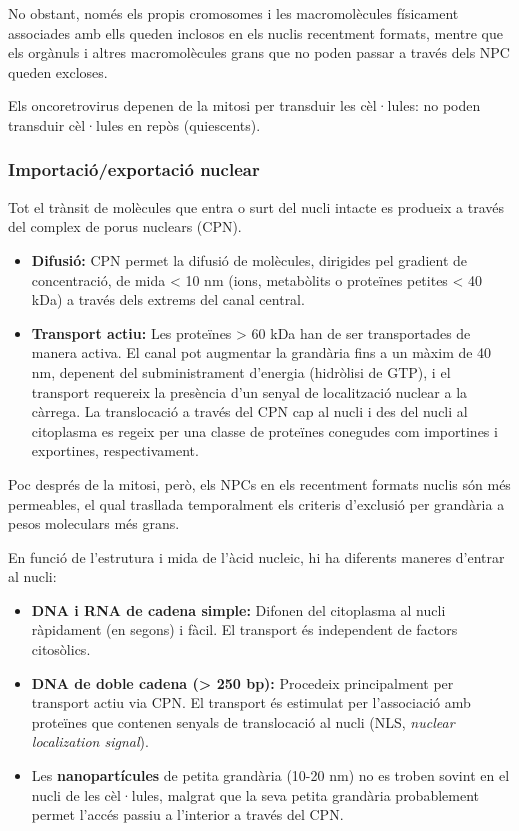 No obstant, només els propis cromosomes i les macromolècules físicament associades amb ells queden inclosos en els nuclis recentment formats, mentre que els orgànuls i altres macromolècules grans que no poden passar a través dels NPC queden excloses.

Els oncoretrovirus depenen de la mitosi per transduir les cèl·lules: no poden transduir cèl·lules en repòs (quiescents).

\subsubsection{Importació/exportació nuclear}
\label{sec:import-nucl}

Tot el trànsit de molècules que entra o surt del nucli intacte es produeix a través del complex de porus nuclears (CPN).
\begin{itemize}
\item \textbf{Difusió:} CPN permet la difusió de molècules, dirigides pel gradient de concentració, de mida < 10 nm (ions, metabòlits o proteïnes petites < 40 kDa) a través dels extrems del canal central.
\item \textbf{Transport actiu:} Les proteïnes > 60 kDa han de ser transportades de manera activa. El canal pot augmentar la grandària fins a un màxim de 40 nm, depenent del subministrament d'energia (hidròlisi de GTP), i el transport requereix la presència d'un senyal de localització nuclear a la càrrega. La translocació a través del CPN cap al nucli i des del nucli al citoplasma es regeix per una classe de proteïnes conegudes com importines i exportines, respectivament.
\end{itemize}

Poc després de la mitosi, però, els NPCs en els recentment formats nuclis són més permeables, el qual trasllada temporalment els criteris d'exclusió per grandària a pesos moleculars més grans.

En funció de l'estrutura i mida de l'àcid nucleic, hi ha diferents maneres d'entrar al nucli:
\begin{itemize}
\item \textbf{DNA i RNA de cadena simple:} Difonen del citoplasma al nucli ràpidament (en segons) i fàcil. El transport és independent de factors citosòlics.

\item \textbf{DNA de doble cadena (> 250 bp):} Procedeix principalment per transport actiu via CPN. El transport és estimulat per l'associació amb proteïnes que contenen senyals de translocació al nucli (NLS, \textit{nuclear localization signal}).

\item Les \textbf{nanopartícules} de petita grandària (10-20 nm) no es troben sovint en el nucli de les cèl·lules, malgrat que la seva petita grandària probablement permet l'accés passiu a l'interior a través del CPN.
\end{itemize}

